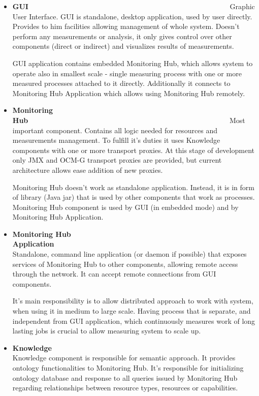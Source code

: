 \begin{itemize}
 \item {\bf GUI}~~~~~~~~~~~~~~~~~~~~~~~~~~~~~~~~~~~~~~~~~~~~~~~~~~~~~~~~\linebreak
Graphic User Interface. GUI is standalone, desktop application, used by user directly. Provides to him facilities
allowing management of whole system. Doesn't perform any measurements or analysis, it only gives control over other
components (direct or indirect) and visualizes results of measurements.

GUI application contains embedded Monitoring Hub, which allows system to operate also in smallest scale - single
measuring process with one or more measured processes attached to it directly. Additionally it connects to
Monitoring Hub Application which allows using Monitoring Hub remotely.

 \item {\bf Monitoring Hub}~~~~~~~~~~~~~~~~~~~~~~~~~~~~~~~~~~~~~~~~~~~~~~~~~~~~~~~~\linebreak
Most important component. Contains all logic needed for resources and measurements management. To fulfill it's
duties it uses Knowledge components with one or more transport proxies. At this stage of development only JMX and
OCM-G transport proxies are provided, but current architecture allows ease addition of new proxies. 

Monitoring Hub doesn't work as standalone application. Instead, it is in form of library (Java jar) that is used by
other components that work as processes. Monitoring Hub component is used by GUI (in embedded mode) and by
Monitoring Hub Application.

 \item {\bf Monitoring Hub Application}~~~~~~~~~~~~~~~~~~~~~~~~~~~~~~~~~~~~~~~~~~~~~~~~~~~~~~~~\linebreak
Standalone, command line application (or daemon if possible) that exposes services of Monitoring Hub to other
components, allowing remote access through the network. It can accept remote connections from GUI components.

It's main responsibility is to allow distributed approach to work with system, when using it in medium to large scale.
Having process that is separate, and independent from GUI application, which continuously measures work of long
lasting jobs is crucial to allow measuring system to scale up. 

 \item {\bf Knowledge}~~~~~~~~~~~~~~~~~~~~~~~~~~~~~~~~~~~~~~~~~~~~~~~~~~~~~~~~\linebreak
Knowledge component is responsible for semantic approach. It provides ontology functionalities to Monitoring Hub. It's
responsible for initializing ontology database and response to all queries issued by Monitoring Hub regarding
relationships between resource types, resources or capabilities.


\end{itemize}
